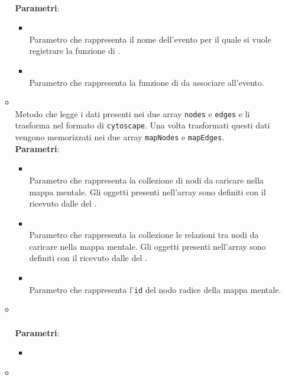 \begin{itemize}
\begin{itemize}
\\ \textbf{Parametri}:
\begin{itemize}
\item {}
\\ Parametro che rappresenta il nome dell'evento per il quale si vuole registrare la funzione di .
\item {}
\\ Parametro che rappresenta la funzione di  da associare all'evento.
\end{itemize}
\item {}
\\ Metodo che legge i dati presenti nei due array \texttt{nodes} e \texttt{edges} e li trasforma nel formato di \texttt{cytoscape}. Una volta trasformati questi dati vengono memorizzati nei due array \texttt{mapNodes} e \texttt{mapEdges}.
\\ \textbf{Parametri}:
\begin{itemize}
\item {}
\\ Parametro che rappresenta la collezione di nodi da caricare nella mappa mentale. Gli oggetti presenti nell'array sono definiti con il \texttt{} ricevuto dalle  del .
\item {}
\\ Parametro che rappresenta la collezione le relazioni tra nodi da caricare nella mappa mentale. Gli oggetti presenti nell'array sono definiti con il \texttt{} ricevuto dalle  del .
\item {}
\\ Parametro che rappresenta l'\texttt{id} del nodo radice della mappa mentale.
\end{itemize}
\item {}
\\ \dpConstructor
\\ \textbf{Parametri}:
\begin{itemize}
\item {}
\\ \dpQParam
\end{itemize}
\item {}

\end{itemize}
\end{itemize}
